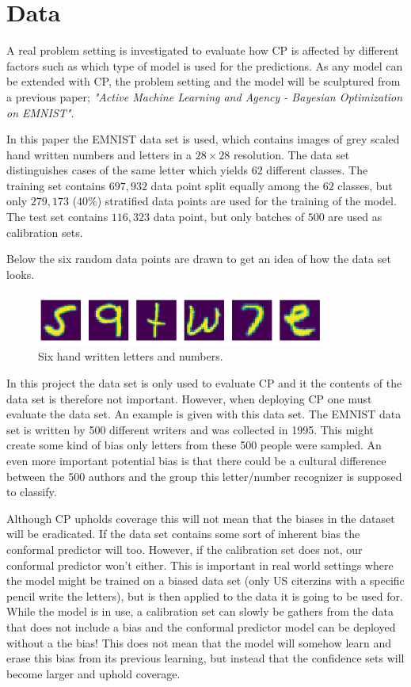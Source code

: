 \chapter{Data}
A real problem setting is investigated to evaluate how CP is affected by different factors such as which type of model is used for the predictions. As any model can be extended with CP, the problem setting and the model will be sculptured from a previous paper; \textit{"Active Machine Learning and Agency - Bayesian Optimization on EMNIST"}. 

In this paper the EMNIST data set is used, which contains images of grey scaled hand written numbers and letters in a $28 \times 28$ resolution. The data set distinguishes cases of the same letter which yields $62$ different classes. The training set contains $697,932$ data point split equally among the $62$ classes, but only $279,173$ ($40\%$) stratified data points are used for the training of the model. The test set contains $116,323$ data point, but only batches of $500$ are used as calibration sets.  

Below the six random data points are drawn to get an idea of how the data set looks. 

\begin{figure}[H]
    \centering
    \includegraphics[width=0.85\textwidth]{media/letters_clipped.png}
    \caption{Six hand written letters and numbers.}
    \label{fig:cnn_architecture}
\end{figure}

In this project the data set is only used to evaluate CP and it the contents of the data set is therefore not important. However, when deploying CP one must evaluate the data set. An example is given with this data set. The EMNIST data set is written by 500 different writers and was collected in 1995. This might create some kind of bias only letters from these 500 people were sampled. An even more important potential bias is that there could be a cultural difference between the 500 authors and the group this letter/number recognizer is supposed to classify. 

Although CP upholds coverage this will not mean that the biases in the dataset will be eradicated. If the data set contains some sort of inherent bias the conformal predictor will too. However, if the calibration set does not, our conformal predictor won’t either. This is important in real world settings where the model might be trained on a biased data set (only US citerzins with a specific pencil write the letters), but is then applied to the data it is going to be used for. While the model is in use, a calibration set can slowly be gathers from the data that does not include a bias and the conformal predictor model can be deployed without a the bias! This does not mean that the model will somehow learn and erase this bias from its previous learning, but instead that the confidence sets will become larger and uphold coverage. 